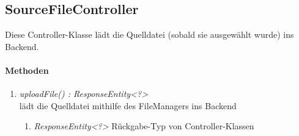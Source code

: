 \subsection*{SourceFileController}\label{srcCon}
Diese Controller-Klasse lädt die Quelldatei (sobald sie ausgewählt wurde) ins Backend.

\paragraph{Methoden}

\begin{enumerate}[+]
	\item \textit{ uploadFile() : ResponseEntity<?>}\\
	 lädt die Quelldatei mithilfe des FileManagers ins Backend
	
	\begin{enumerate}[$\circ$]
		\item \textit{ResponseEntity<?>} Rückgabe-Typ von Controller-Klassen
	\end{enumerate}

\end{enumerate}
